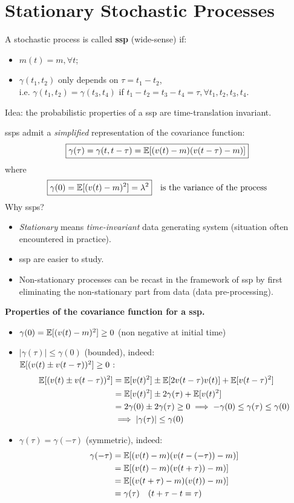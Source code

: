 \section{Stationary Stochastic Processes}
A stochastic process is called \textbf{\gls{ssp}} (wide-sense) if:
\begin{itemize}
	\item $m(t)=m, \forall t$;
	\item $\gamma(t_{1}, t_{2})$ only depends on $\tau=t_{1}-t_{2}$,\\
	i.e. $\gamma(t_{1}, t_{2})=\gamma(t_{3}, t_{4})$ if $t_{1}-t_{2}=t_{3}-t_{4}=\tau, \forall t_{1}, t_{2}, t_{3}, t_{4}$.
\end{itemize}
Idea: the probabilistic properties of a \gls{ssp} are time-translation invariant.

\glspl{ssp} admit a \emph{simplified} representation of the covariance function:
\[
	\boxed{\gamma(\tau)=\gamma(t, t-\tau)=\mathbb{E}[(v(t)-m)(v(t-\tau)-m)]}
\]
where
\[
	\boxed{\gamma(0)=\mathbb{E}[(v(t)-m)^{2}]=\lambda^2} \quad \text{is the variance of the process}
\]
Why \glspl{ssp}?
\begin{itemize}
	\item \emph{Stationary} means \emph{time-invariant} data generating system (situation often encountered in practice).
	\item \gls{ssp} are easier to study.
	\item Non-stationary processes can be recast in the framework of \gls{ssp} by first eliminating the non-stationary part from data (data pre-processing).
\end{itemize}

\textbf{Properties of the covariance function for a \gls{ssp}.}
\begin{itemize}
	\item $\gamma(0)=\mathbb{E}[(v(t)-m)^{2}] \geq 0$ (non negative at initial time)
	\item $|\gamma(\tau)| \leq \gamma(0)$ (bounded), indeed:\\
	\quad  {} $\mathbb{E}[(v(t) \pm v(t-\tau))^2]\ge0$ :\\
	\vspace{-3ex}
	\begin{align*}
		\mathbb{E}[(v(t) \pm v(t-\tau))^2] &= \mathbb{E}[v(t)^2] \pm \mathbb{E}[2v(t-\tau)v(t)]+\mathbb{E}[v(t-\tau)^2]\\
		&=\mathbb{E}[v(t)^2] \pm 2\gamma(\tau)+\mathbb{E}[v(t)^2]\\
		&=2\gamma(0) \pm 2\gamma(\tau) \ge 0 
		\implies -\gamma(0) \leq \gamma(\tau) \leq \gamma(0)\\
		&\implies |\gamma(\tau)| \leq \gamma(0)
	\end{align*}
	\item $\gamma(\tau)=\gamma(-\tau)$ (symmetric), indeed:
	\begin{align*}
		\gamma(-\tau)&=\mathbb{E}[(v(t)-m)(v(t-(-\tau))-m)]\\
		&=\mathbb{E}[(v(t)-m)(v(t+\tau))-m)]\\
		&=\mathbb{E}[(v(t+\tau)-m)(v(t))-m)]\\
		&=\gamma(\tau) \quad(t+\tau-t=\tau)
	\end{align*}
\end{itemize}

